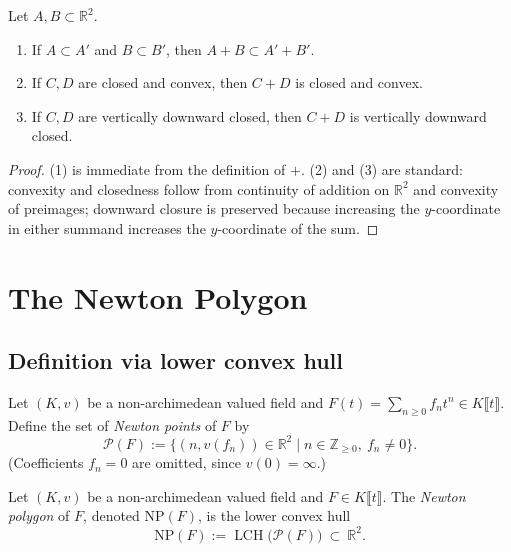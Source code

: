\begin{lemma}
  \label{lem:lch_minkowski_basic}
  \leanok
  Let $A,B\subset\mathbb{R}^2$.
  \begin{enumerate}
    \item If $A\subset A'$ and $B\subset B'$, then $A+B\subset A'+B'$.
    \item If $C,D$ are closed and convex, then $C+D$ is closed and convex.
    \item If $C,D$ are vertically downward closed, then $C+D$ is vertically downward closed.
  \end{enumerate}
\end{lemma}

\begin{proof}
  \leanok
  (1) is immediate from the definition of $+$.
  (2) and (3) are standard: convexity and closedness follow from continuity of addition on $\mathbb{R}^2$ and
  convexity of preimages; downward closure is preserved because increasing the $y$-coordinate in either summand
  increases the $y$-coordinate of the sum.
\end{proof}

\section{The Newton Polygon}

\subsection{Definition via lower convex hull}

\begin{definition}
  \label{def:newton_points}
  \leanok
  Let $(K,v)$ be a non-archimedean valued field and $F(t)=\sum_{n\ge 0} f_n t^n\in K\llbracket t\rrbracket$.
  Define the set of \emph{Newton points} of $F$ by
  \[
    \mathcal{P}(F) := \{(n, v(f_n)) \in \mathbb{R}^2 \mid n\in\mathbb{Z}_{\ge 0},\ f_n\neq 0\}.
  \]
  (Coefficients $f_n=0$ are omitted, since $v(0)=\infty$.)
\end{definition}

\begin{definition}
  \label{def:newton_polygon}
  \leanok
  Let $(K,v)$ be a non-archimedean valued field and $F\in K\llbracket t\rrbracket$.
  The \emph{Newton polygon} of $F$, denoted $\mathrm{NP}(F)$, is the lower convex hull
  \[
    \mathrm{NP}(F) := \operatorname{LCH}\big(\mathcal{P}(F)\big)\ \subset\ \mathbb{R}^2.
  \]
\end{definition}

